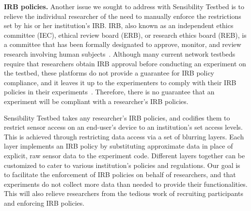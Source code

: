 \textbf{IRB policies.}
Another issue we sought to address with Sensibility Testbed is to 
relieve the individual researcher of the need to manually enforce 
the restrictions set by his or her institution's IRB.
IRB, also known as an independent ethics committee (IEC), ethical 
review board (ERB), or research ethics board (REB), is a committee 
that has been formally designated to approve, monitor, and review 
research involving human subjects~\cite{irb}. Although many current network 
testbeds require that researchers obtain IRB approval before conducting
an experiment on the testbed, these platforms do not provide a guarantee 
for IRB policy compliance, and 
it leaves it up to the experimenters to comply with their IRB policies in their 
experiments~\cite{nandugudi2013phonelab, nikravesh2015mobilyzer}. 
Therefore, there is no guarantee that an 
experiment will be compliant with a researcher's IRB policies.

Sensibility Testbed takes any researcher's IRB policies, and codifies 
them to restrict sensor access on an end-user's device to 
an institution's set access levels. 
This is achieved through restricting data access  via
a set of blurring layers. Each layer implements an IRB policy by substituting 
approximate data in place of explicit, raw sensor data to the experiment code. Different layers 
together can be customized to cater to various institution's 
policies and regulations. Our goal is to facilitate the enforcement of 
IRB policies on behalf of researchers, and that experiments 
do not collect more data than needed to provide their functionalities.
This will also relieve researchers from the tedious work of 
recruiting participants and enforcing IRB policies.

